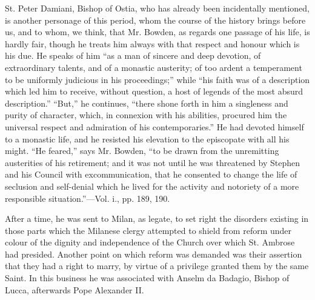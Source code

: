 St. Peter Damiani, Bishop of Ostia, who has
already been incidentally mentioned, is another personage of this
period, whom the course of the history brings before us, and to whom,
we think, that Mr. Bowden, as regards one passage of his life, is
hardly fair, though he treats him always with that respect and honour
which is his due. He speaks of him ``as a man of sincere and deep
devotion, of extraordinary talents, and of a monastic austerity; of
too ardent a temperament to be uniformly judicious in his proceedings;''
while ``his faith was of a description which led him to receive,
without question, a host of legends of the most absurd description.'' ``But,''
he continues, ``there shone forth in him a singleness and purity of
character, which, in connexion with his abilities, procured him
the universal respect and admiration of his contemporaries.'' He had
devoted himself to a monastic life, and he resisted his elevation to
the episcopate with all his might. ``He feared,'' says Mr. Bowden, ``to
be drawn from the unremitting austerities of his retirement; and it
was not until he was threatened by Stephen and his Council with
excommunication, that he consented to change the life of seclusion and
self-denial which he lived for the activity and notoriety of a more
responsible situation.''—Vol. i., pp. 189, 190.

After a time, he was sent to Milan, as legate, to
set right the disorders existing in those parts which the Milanese
clergy attempted to shield from reform under colour of the dignity and
independence of the Church over which St. Ambrose had presided.
Another point on which reform was demanded was their assertion that
they had a right to marry, by virtue of a privilege granted them by
the same Saint. In this business he was associated with Anselm da
Badagio, Bishop of Lucca, afterwards Pope Alexander II.

